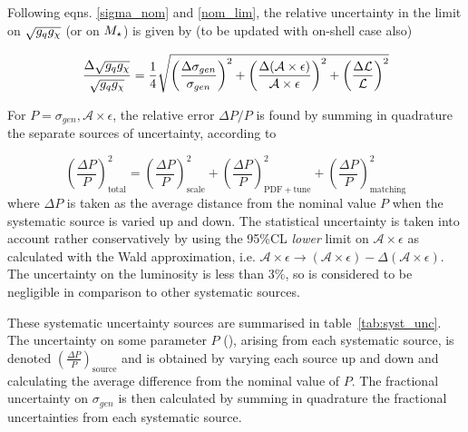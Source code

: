 Following eqns. \ref{sigma_nom} and \ref{nom_lim}, the relative uncertainty in the limit on $\sqrt{g_q g_{\chi}}$ (or on $M_{\star}$) is given by (to be updated with on-shell case also)

\begin{equation}
\label{unc_lim}
\frac{\Delta \sqrt{g_q g_{\chi}}}{\sqrt{g_q g_{\chi}}} = \frac{1}{4} \sqrt{\left( \frac{\Delta \sigma_{gen}}{\sigma_{gen}} \right)^2 + \left( \frac{\Delta (\mathcal{A} \times \epsilon)}{\mathcal{A} \times \epsilon} \right)^2 + \left( \frac{\Delta \mathcal{L}}{\mathcal{L}} \right)^2}
\end{equation}

For $P = \sigma_{gen}, \mathcal{A} \times \epsilon$, the relative error $\Delta P / P$ is found by summing in quadrature the separate sources of uncertainty, according to

\begin{equation}
\label{unc_P}
\left ( \frac{\Delta P}{P} \right )^2_{\mathrm{total}} = \left ( \frac{\Delta P}{P} \right )^2_{\mathrm{scale}} + \left ( \frac{\Delta P}{P} \right )^2_{\mathrm{PDF+tune}} + \left ( \frac{\Delta P}{P} \right )^2_{\mathrm{matching}}
\end{equation}
where $\Delta P$ is taken as the average distance from the nominal value $P$ when the systematic source is varied up and down. The statistical uncertainty is taken into account rather conservatively by using the 95\%CL \emph{lower} limit on $\mathcal{A} \times \epsilon$ as calculated with the Wald approximation, i.e. $\mathcal{A} \times \epsilon \rightarrow (\mathcal{A} \times \epsilon) - \Delta(\mathcal{A} \times \epsilon)$. The uncertainty on the luminosity is less than 3\%, so is considered to be negligible in comparison to other systematic sources.

\bigskip
\bigskip

\iffalse
{}

These systematic uncertainty sources are summarised in table~\ref{tab:syst_unc}. The uncertainty on some parameter $P$ (), arising from each systematic source, is denoted $\left ( \frac{\Delta P}{P} \right)_{\mathrm{source}}$ and is obtained by varying each source up and down and calculating the average difference from the nominal value of $P$. The fractional uncertainty on $\sigma_{gen}$ is then calculated by summing in quadrature the fractional uncertainties from each systematic source.

